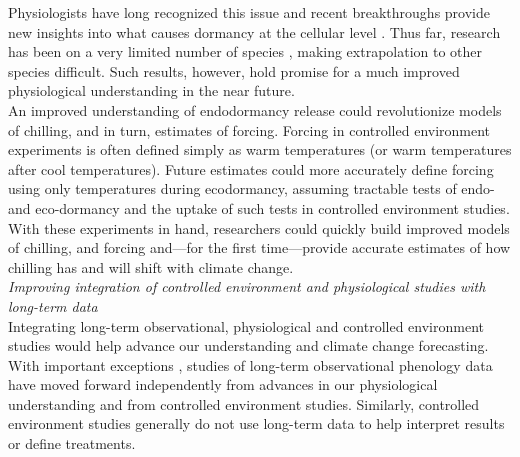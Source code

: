 \documentclass[11pt,letter]{article}
\begin{document}
Physiologists have long recognized this issue and recent breakthroughs provide new insights into what causes dormancy at the cellular level \citep{vanderschoot2014}. Thus far, research has been on a very limited number of species \citep{rinne2011,singh2019}, making extrapolation to other species difficult. Such results, however, hold promise for a much improved physiological understanding in the near future.\\

An improved understanding of endodormancy release could revolutionize models of chilling, and in turn, estimates of forcing. Forcing in controlled environment experiments is often defined simply as warm temperatures (or warm temperatures after cool temperatures). Future estimates could more accurately define forcing using only temperatures during ecodormancy, assuming tractable tests of endo- and eco-dormancy and the uptake of such tests in controlled environment studies. With these experiments in hand, researchers could quickly build improved models of chilling, and forcing and---for the first time---provide accurate estimates of how chilling has and will shift with climate change.\\ 

\emph{Improving integration of controlled environment and physiological studies with long-term data}\\
Integrating long-term observational, physiological and controlled environment studies would help advance our understanding and climate change forecasting. With important exceptions \citep[e.g.,][]{gauzere2017}, studies of long-term observational phenology data have moved forward independently from advances in our physiological understanding and from controlled environment studies. Similarly, controlled environment studies generally do not use long-term data to help interpret results or define treatments. \\
\end{document}
